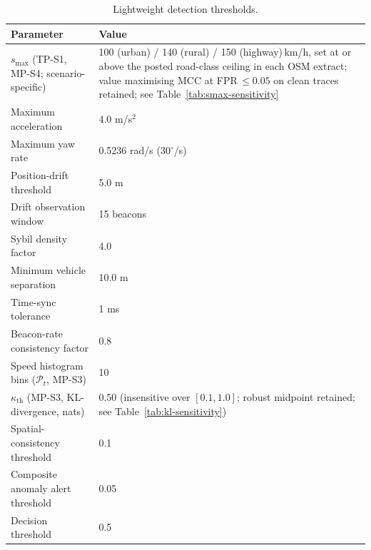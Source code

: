 \documentclass[12pt, a4paper]{report}
\begin{document}
\begin{table}[H]
\centering
\caption{Lightweight detection thresholds.}
\label{tab:set-lw}
\begin{tabular}{|p{5.2cm}|p{8.8cm}|}
\hline
\textbf{Parameter} & \textbf{Value} \\
\hline
$s_{\max}$ (TP-S1, MP-S4; scenario-specific)
  & 100 (urban) / 140 (rural) / 150 (highway)\,km/h,
    set at or above the posted road-class ceiling in
    each OSM extract; value maximising MCC at
    FPR\,$\leq 0.05$ on clean traces retained;
    see Table~\ref{tab:smax-sensitivity} \\
\hline
Maximum acceleration                     & 4.0 m/s$^2$ \\
\hline
Maximum yaw rate                         & 0.5236 rad/s ($30^\circ$/s) \\
\hline
Position-drift threshold                 & 5.0 m \\
\hline
Drift observation window                 & 15 beacons \\
\hline
Sybil density factor                     & 4.0 \\
\hline
Minimum vehicle separation               & 10.0 m \\
\hline
Time-sync tolerance                      & 1 ms \\
\hline
Beacon-rate consistency factor           & 0.8 \\
\hline
Speed histogram bins ($\mathcal{P}_t$, MP-S3) & 10 \\
\hline
$\kappa_{\mathrm{th}}$ (MP-S3, KL-divergence, nats) &
  0.50 (insensitive over $[0.1,1.0]$; robust midpoint
  retained; see Table~\ref{tab:kl-sensitivity}) \\
\hline
Spatial-consistency threshold            & 0.1 \\
\hline
Composite anomaly alert threshold        & 0.05 \\
\hline
Decision threshold                       & 0.5 \\
\hline
\end{tabular}
\end{table}
\end{document}
